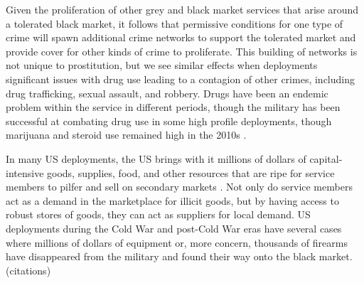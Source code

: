 Given the proliferation of other grey and black market services that arise around a tolerated black market, it follows that permissive conditions for one type of crime will spawn additional crime networks to support the tolerated market and provide cover for other kinds of crime to proliferate. This building of networks is not unique to prostitution, but we see similar effects when deployments significant issues with drug use leading to a contagion of other crimes, including drug trafficking, sexual assault, and robbery. Drugs have been an endemic problem within the service in different periods, though the military has been successful at combating drug use in some high profile deployments, though marijuana and steroid use remained high in the 2010s \cite{Nelson1987,ballweg1991,Baker2004,bucher2012}. 

In many US deployments, the US brings with it millions of dollars of capital-intensive goods, supplies, food, and other resources that are ripe for service members to pilfer and sell on secondary markets \cite{Bryant1979,Nelson1987}. Not only do service members act as a demand in the marketplace for illicit goods, but by having access to robust stores of goods, they can act as suppliers for local demand. US deployments during the Cold War and post-Cold War eras have several cases where millions of dollars of equipment or, more concern, thousands of firearms have disappeared from the military and found their way onto the black market. (citations)


